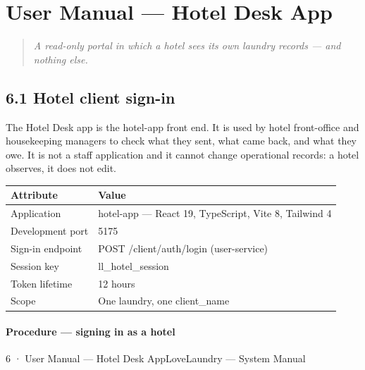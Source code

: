\documentclass[11pt,a4paper,oneside]{book}
\begin{document}
\chapter{User Manual — Hotel Desk App}
\begin{quote}\itshape A read-only portal in which a hotel sees its own laundry records — and nothing else.\end{quote}
\section{6.1 Hotel client sign-in}
The Hotel Desk app is the hotel-app front end. It is used by hotel front-office and housekeeping managers to check what they sent, what came back, and what they owe. It is not a staff application and it cannot change operational records: a hotel observes, it does not edit.

\begin{center}\small
\begin{tabularx}{\linewidth}{|X|X|}
\hline
\rowcolor{lightgrey}
\textbf{Attribute} & \textbf{Value} \\ \hline
Application & hotel-app — React 19, TypeScript, Vite 8, Tailwind 4 \\ \hline
Development port & 5175 \\ \hline
Sign-in endpoint & POST /client/auth/login (user-service) \\ \hline
Session key & ll\_hotel\_session \\ \hline
Token lifetime & 12 hours \\ \hline
Scope & One laundry, one client\_name \\ \hline
\end{tabularx}
\end{center}
\subsubsection*{Procedure — signing in as a hotel}
6 · User Manual — Hotel Desk AppLoveLaundry — System Manual
\end{document}
